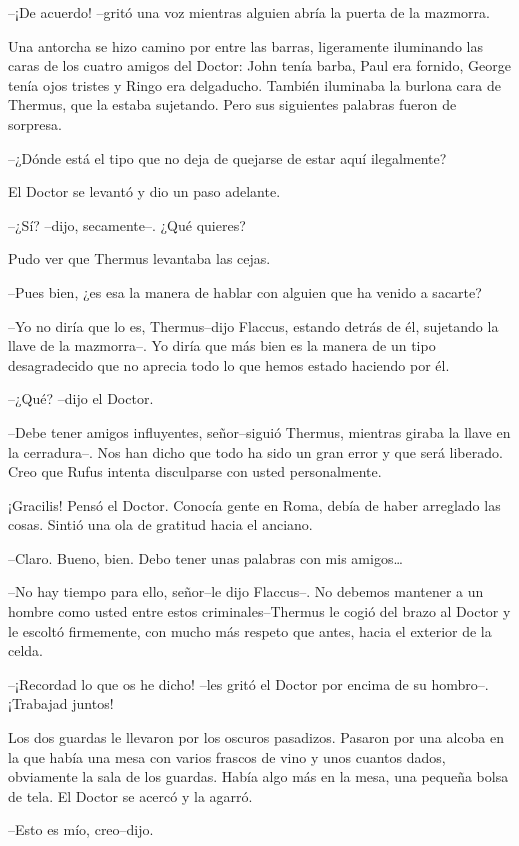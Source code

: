 --¡De acuerdo! --gritó una voz mientras alguien abría la puerta de la
mazmorra.

Una antorcha se hizo camino por entre las barras, ligeramente iluminando
las caras de los cuatro amigos del Doctor: John tenía barba, Paul era
fornido, George tenía ojos tristes y Ringo era delgaducho. También
iluminaba la burlona cara de Thermus, que la estaba sujetando. Pero sus
siguientes palabras fueron de sorpresa.

--¿Dónde está el tipo que no deja de quejarse de estar aquí ilegalmente?

El Doctor se levantó y dio un paso adelante.

--¿Sí? --dijo, secamente--. ¿Qué quieres?

Pudo ver que Thermus levantaba las cejas.

--Pues bien, ¿es esa la manera de hablar con alguien que ha venido a
sacarte?

--Yo no diría que lo es, Thermus--dijo Flaccus, estando detrás de él,
sujetando la llave de la mazmorra--. Yo diría que más bien es la manera
de un tipo desagradecido que no aprecia todo lo que hemos estado
haciendo por él.

--¿Qué? --dijo el Doctor.

--Debe tener amigos influyentes, señor--siguió Thermus, mientras giraba
la llave en la cerradura--. Nos han dicho que todo ha sido un gran error
y que será liberado. Creo que Rufus intenta disculparse con usted
personalmente.

¡Gracilis! Pensó el Doctor. Conocía gente en Roma, debía de haber
arreglado las cosas. Sintió una ola de gratitud hacia el anciano.

--Claro. Bueno, bien. Debo tener unas palabras con mis amigos\ldots{}

--No hay tiempo para ello, señor--le dijo Flaccus--. No debemos mantener
a un hombre como usted entre estos criminales--Thermus le cogió del
brazo al Doctor y le escoltó firmemente, con mucho más respeto que
antes, hacia el exterior de la celda.

--¡Recordad lo que os he dicho! --les gritó el Doctor por encima de su
hombro--. ¡Trabajad juntos!

Los dos guardas le llevaron por los oscuros pasadizos. Pasaron por una
alcoba en la que había una mesa con varios frascos de vino y unos
cuantos dados, obviamente la sala de los guardas. Había algo más en la
mesa, una pequeña bolsa de tela. El Doctor se acercó y la agarró.

--Esto es mío, creo--dijo.

